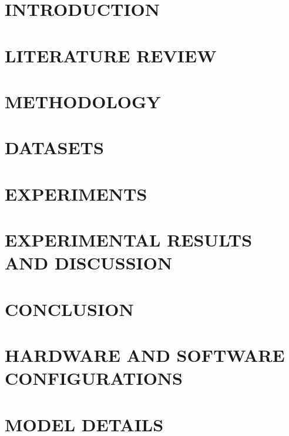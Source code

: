 \documentclass[12pt]{report}
\theoremstyle{definition}
\theoremstyle{definition}
\theoremstyle{remark}
\theoremstyle{definition}
\begin{document}
\clearpage
{}

\chapter{INTRODUCTION}
\label{introduction}


\chapter{LITERATURE REVIEW}
\label{litreview}


\chapter{METHODOLOGY}
\label{meth}


\chapter{DATASETS}
\label{datasets}


\chapter{EXPERIMENTS}
\label{experiments}


\chapter{EXPERIMENTAL RESULTS AND DISCUSSION}
\label{results}


\chapter{CONCLUSION}
\label{conclusion}


\appendix
\chapter{HARDWARE AND SOFTWARE CONFIGURATIONS}
\label{appendixA}



\chapter{MODEL DETAILS}
\label{appendixB}


%
%
%
\printbibliography
{}
\end{document}
